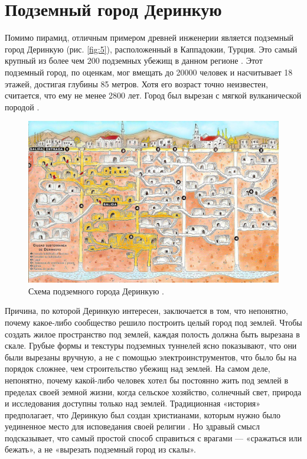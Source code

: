 \documentclass[10pt,twocolumn,letterpaper]{article}
\begin{document}
\section{Подземный город Деринкую}

Помимо пирамид, отличным примером древней инженерии является подземный город Деринкую (рис. \ref{fig:5}), расположенный в Каппадокии, Турция. Это самый крупный из более чем 200 подземных убежищ в данном регионе \cite{54}. Этот подземный город, по оценкам, мог вмещать до 20000 человек и насчитывает 18 этажей, достигая глубины 85 метров. Хотя его возраст точно неизвестен, считается, что ему не менее 2800 лет. Город был вырезан с мягкой вулканической породой \cite{52, 53}.

\begin{figure}[b]
\begin{center}
   \includegraphics[width=1\linewidth]{derinkuyu.jpeg}
\end{center}
   \caption{Схема подземного города Деринкую \cite{56}.}
\label{fig:5}
\label{fig:onecol}
\end{figure}

Причина, по которой Деринкую интересен, заключается в том, что непонятно, почему какое-либо сообщество решило построить целый город под землей. Чтобы создать жилое пространство под землей, каждая полость должна быть вырезана в скале. Грубые формы и текстуры подземных туннелей ясно показывают, что они были вырезаны вручную, а не с помощью электроинструментов, что было бы на порядок сложнее, чем строительство убежищ над землей. На самом деле, непонятно, почему какой-либо человек хотел бы постоянно жить под землей в пределах своей земной жизни, когда сельское хозяйство, солнечный свет, природа и исследования доступны только над землей. Традиционная «история» предполагает, что Деринкую был создан христианами, которым нужно было уединенное место для исповедания своей религии \cite{53}. Но здравый смысл подсказывает, что самый простой способ справиться с врагами — «сражаться или бежать», а не «вырезать подземный город из скалы».
\end{document}
